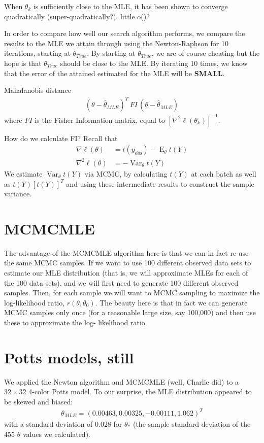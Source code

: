 \documentclass{amsbook}
\DeclareMathOperator{\E}{E}
\DeclareMathOperator{\Var}{Var}
\newcommand{\yobs}{y_{\textrm{obs}}}
\theoremstyle{definition}
\theoremstyle{remark}
\begin{document}
When $\theta_k$ is sufficiently close to the MLE, it has been shown to converge 
quadratically (super-quadratically?).  little o()?  

In order to compare how well our search algorithm performs, we compare the results to 
the MLE we attain through using the Newton-Raphson for 10 iterations, starting at $
\theta_{True}$.  By starting at $\theta_{True}$, we are of course cheating but the 
hope is that $\theta_{True}$ should be close to the MLE.  By iterating 10 times, we 
know that the error of the attained estimated for the MLE will be \textbf{SMALL}.

Mahalanobis distance
\begin{align*}
	( \theta - \hat{\theta}_{MLE} )^T \, FI \, ( \theta - \hat{\theta}_{MLE} )
\end{align*}
where $FI$ is the Fisher Information matrix, equal to $\left [  \nabla^2 \ell 
(\theta_k) \right ]^{-1}$.

How do we calculate FI?
Recall that 
\begin{align*}
	\nabla \ell (\theta) &= t(\yobs) - \E_{\theta} t(Y) \\
	\nabla^2 \ell (\theta) &= - \Var_{\theta} t(Y)
\end{align*}
We estimate $\Var_{\theta} t(Y)$ via MCMC, by calculating $t(Y)$ at each batch as 
well as $t(Y) [t(Y)]^T$ and using these intermediate results to construct the sample 
variance.

\section{MCMCMLE}
The advantage of the MCMCMLE algorithm here is that we can in fact re-use the same 
MCMC samples.  If we want to use 100 different observed data sets to estimate our MLE 
distribution (that is, we will approximate MLEs for each of the 100 data sets), and 
we will first need to generate 100 different observed samples.  Then, for each sample 
we will want to MCMC sampling to maximize the log-likelihood ratio, $r( \theta, 
\theta_0)$.  The beauty here is that in fact we can generate MCMC samples only once 
(for a reasonable large size, say 100,000) and then use these to approximate the log-
likelihood ratio.

\section{Potts models, still}
We applied the Newton algorithm and MCMCMLE (well, Charlie did) to a $32 \times 32$ 
4-color Potts model.  To our surprise, the MLE distribution appeared to be skewed and 
biased:
\begin{align*}
\theta_{MLE} = (0.00463, 0.00325, -0.00111, 1.062 )^T
\end{align*}
with a standard deviation of 0.028 for $\theta_*$ (the sample standard deviation of 
the 455 $\theta$ values we calculated).
\end{document}
